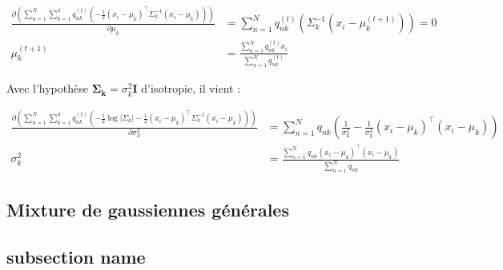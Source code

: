 \documentclass[12pt,a4paper,onecolumn]{article}
\begin{document}
\begin{equation}
	\begin{split}
		\frac{\partial\left(\sum_{n = 1}^N\sum_{k = 1}^4q_{nk}^{(t)}\left(
		-\frac{1}{2}\left(x_i - \mu_k\right)^{\intercal}\Sigma_k^{-1}\left(x_i - \mu_k\right)\right)\right)}{\partial\mu_k} &=
		\sum_{n = 1}^Nq_{nk}^{(t)}\left(\Sigma_k^{-1}(x_i-\mu_k^{(t+1)})\right) = 0\\
		\mu_k^{(t + 1)} &= \frac{\sum_{n = 1}^Nq_{nk}^{(t)}x_i}{\sum_{n = 1}^Nq_{nk}^{(t)}}
	\end{split}
\end{equation}

Avec l'hypothèse \(\bm{\Sigma_k} = \sigma_k^2\bm{I}\) d'isotropie, il vient :

\begin{equation}
	\begin{split}
		\frac{\partial\left(\sum_{n = 1}^N\sum_{k = 1}^4q_{nk}^{(t)}\left(
		-\frac{1}{2}\log|\Sigma_k|-\frac{1}{2}\left(x_i - \mu_k\right)^{\intercal}\Sigma_k^{-1}\left(x_i - \mu_k\right)\right)\right)}{\partial\sigma_k^2} &=
		\sum_{n = 1}^Nq_{nk}\left(\frac{1}{\sigma_k^2} -\frac{1}{\sigma_k^4}\left(x_i-\mu_k\right)^{\intercal}\left(x_i-\mu_k\right)\right)\\
		\sigma_k^2 &= \frac{\sum_{n = 1}^Nq_{nk}\left(x_i-\mu_k\right)^{\intercal}\left(x_i-\mu_k\right)}{\sum_{n = 1}^Nq_{nk}}
	\end{split}
\end{equation}

\subsection{Mixture de gaussiennes générales}

\subsection{subsection name}
\end{document}
